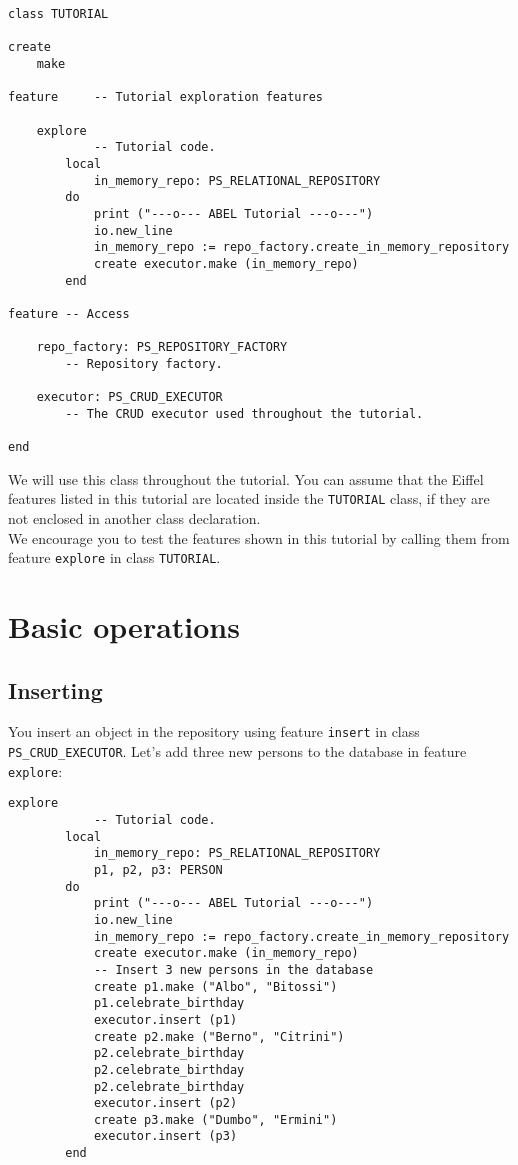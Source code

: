 \documentclass[a4paper,12pt]{report}
\begin{document}
\begin{lstlisting}[language=OOSC2Eiffel, captionpos=b, caption={The TUTORIAL class}, label={lst:tutorial_class}]
class TUTORIAL

create
	make

feature 	-- Tutorial exploration features

	explore
			-- Tutorial code.
		local
			in_memory_repo: PS_RELATIONAL_REPOSITORY
		do
			print ("---o--- ABEL Tutorial ---o---")
			io.new_line
			in_memory_repo := repo_factory.create_in_memory_repository
			create executor.make (in_memory_repo)
		end

feature -- Access

	repo_factory: PS_REPOSITORY_FACTORY
		-- Repository factory.	

	executor: PS_CRUD_EXECUTOR
		-- The CRUD executor used throughout the tutorial.

end
\end{lstlisting}
We will use this class throughout the tutorial. You can assume that the Eiffel features listed in this tutorial are located inside the \lstinline!TUTORIAL! class, if they are not enclosed in another class declaration.\\ 
We encourage you to test the features shown in this tutorial by calling them from feature \lstinline{explore} in class \lstinline!TUTORIAL!.
\chapter{Basic operations}

\section{Inserting}

You insert an object in the repository using feature \lstinline{insert} in class\\ 
\lstinline{PS_CRUD_EXECUTOR}. Let's add three new persons to the database in feature \lstinline{explore}:
\begin{lstlisting}[language=OOSC2Eiffel, captionpos=b, caption={Insertion code.}, label={lst:tutorial_insert}]
	explore
			-- Tutorial code.
		local
			in_memory_repo: PS_RELATIONAL_REPOSITORY
			p1, p2, p3: PERSON
		do
			print ("---o--- ABEL Tutorial ---o---")
			io.new_line
			in_memory_repo := repo_factory.create_in_memory_repository
			create executor.make (in_memory_repo)
			-- Insert 3 new persons in the database
			create p1.make ("Albo", "Bitossi")
			p1.celebrate_birthday
			executor.insert (p1)
			create p2.make ("Berno", "Citrini")
			p2.celebrate_birthday
			p2.celebrate_birthday
			p2.celebrate_birthday
			executor.insert (p2)
			create p3.make ("Dumbo", "Ermini")
			executor.insert (p3)			
		end
\end{lstlisting}
\end{document}
